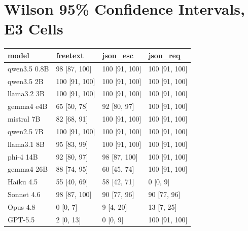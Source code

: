 \documentclass[11pt]{article}
\begin{document}
\appendix
\section{Wilson 95\% Confidence Intervals, E3 Cells}

\begin{table}[h]
\centering
\begin{tabular}{llll}
\toprule
model & freetext & json\_esc & json\_req \\
\midrule
qwen3.5 0.8B & 98 [87, 100] & 100 [91, 100] & 100 [91, 100] \\
qwen3.5 2B & 100 [91, 100] & 100 [91, 100] & 100 [91, 100] \\
llama3.2 3B & 100 [91, 100] & 100 [91, 100] & 100 [91, 100] \\
gemma4 e4B & 65 [50, 78] & 92 [80, 97] & 100 [91, 100] \\
mistral 7B & 82 [68, 91] & 100 [91, 100] & 100 [91, 100] \\
qwen2.5 7B & 100 [91, 100] & 100 [91, 100] & 100 [91, 100] \\
llama3.1 8B & 95 [83, 99] & 100 [91, 100] & 100 [91, 100] \\
phi-4 14B & 92 [80, 97] & 98 [87, 100] & 100 [91, 100] \\
gemma4 26B & 88 [74, 95] & 60 [45, 74] & 100 [91, 100] \\
Haiku 4.5 & 55 [40, 69] & 58 [42, 71] & 0 [0, 9] \\
Sonnet 4.6 & 98 [87, 100] & 90 [77, 96] & 90 [77, 96] \\
Opus 4.8 & 0 [0, 7] & 9 [4, 20] & 13 [7, 25] \\
GPT-5.5 & 2 [0, 13] & 0 [0, 9] & 100 [91, 100] \\
\bottomrule
\end{tabular}
\end{table}
\end{document}
